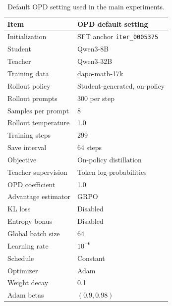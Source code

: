 \begin{table}[t]
\centering
\small
\setlength{\tabcolsep}{4pt}
\renewcommand{\arraystretch}{1.08}
\begin{tabularx}{\linewidth}{@{}lX@{}}
\toprule
\textbf{Item} & \textbf{OPD default setting} \\
\midrule
Initialization & SFT anchor \texttt{iter\_0005375} \\
Student & Qwen3-8B \\
Teacher & Qwen3-32B \\
Training data & dapo-math-17k  \\
Rollout policy & Student-generated, on-policy \\
Rollout prompts & 300 per step \\
Samples per prompt & 8 \\
Rollout temperature & 1.0 \\
Training steps & 299 \\
Save interval & 64 steps \\
Objective & On-policy distillation \\
Teacher supervision & Token log-probabilities \\
OPD coefficient & 1.0 \\
Advantage estimator & GRPO \\
KL loss & Disabled \\
Entropy bonus & Disabled \\
Global batch size & 64 \\
Learning rate & $10^{-6}$ \\
Schedule & Constant \\
Optimizer & Adam \\
Weight decay & 0.1 \\
Adam betas & $(0.9,0.98)$ \\
\bottomrule
\end{tabularx}
\caption{Default OPD setting used in the main experiments.}
\label{tab:opd-default-setting}
\end{table}

